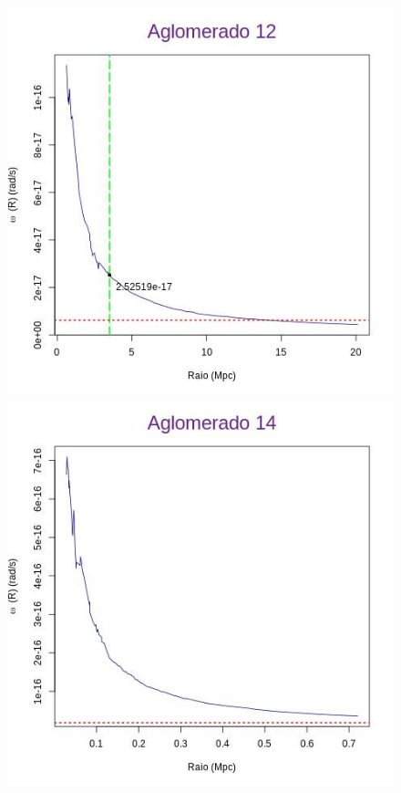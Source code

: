 \begin{anexosenv}
\begin{figure}[H]
\begin{center}
\includegraphics[scale=.3]{04-figuras/selec20/perfil12}
\includegraphics[scale=.3]{04-figuras/selec20/perfil14}

\end{center}
\end{figure}
\end{anexosenv}
